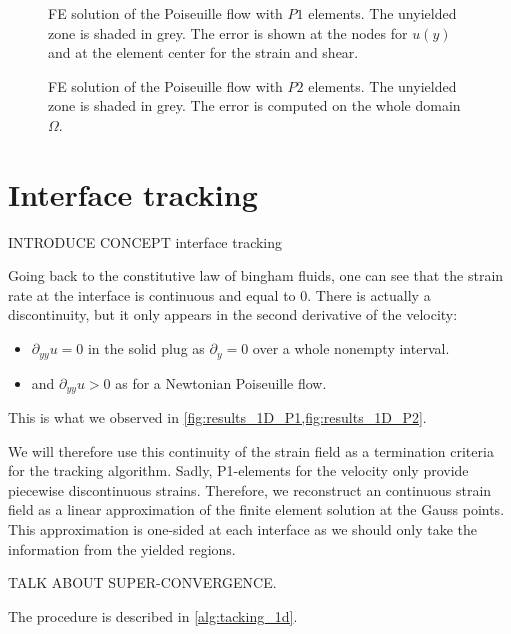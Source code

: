\documentclass[11 pt]{report}
\begin{document}
\begin{figure}
    \centering
    
    \caption{FE solution of the Poiseuille flow with $P1$ elements. The unyielded zone is shaded in grey. The error is shown at the nodes for $u(y)$ and at the element center for the strain and shear.}
    \label{fig:results_1D_P1}
\end{figure}

\begin{figure}
    \centering
    
    \caption{FE solution of the Poiseuille flow with $P2$ elements. The unyielded zone is shaded in grey. The error is computed on the whole domain $\Omega$.}
    \label{fig:results_1D_P2}
\end{figure}


\chapter{Interface tracking}

INTRODUCE CONCEPT interface tracking

Going back to the constitutive law of bingham fluids, one can see that the strain rate at the interface is continuous and equal to $0$. There is actually a discontinuity, but it only appears in the second derivative of the velocity:
\begin{itemize}[label=---, topsep=0pt]
    \setlength{\itemsep}{0pt}
    \item $\partial_{yy} u = 0$ in the solid plug as $\partial_y=0$ over a whole nonempty interval.
    \item and $\partial_{yy} u > 0$ as for a Newtonian Poiseuille flow.
\end{itemize}    
This is what we observed in \cref{fig:results_1D_P1,fig:results_1D_P2}.

We will therefore use this continuity of the strain field as a termination criteria for the tracking algorithm. Sadly, P1-elements for the velocity only provide piecewise discontinuous strains. Therefore, we reconstruct an continuous strain field as a linear approximation of the finite element solution at the Gauss points. This approximation is one-sided at each interface as we should only take the information from the yielded regions.

TALK ABOUT SUPER-CONVERGENCE.

The procedure is described in \cref{alg:tacking_1d}.

\end{document}
